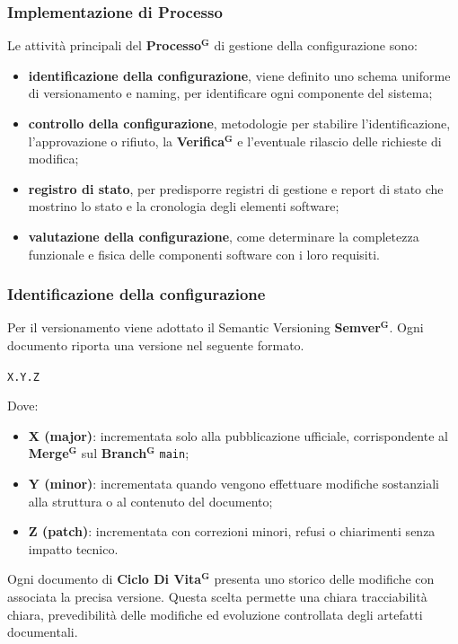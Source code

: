 \documentclass[a4paper,12pt]{article}
\newcommand{\term}[1]{\textbf{#1}$^\mathbf{G}$}
\begin{document}
\subsubsection{Implementazione di Processo}
Le attività principali del \term{Processo} di gestione della configurazione sono:
\begin{itemize}
    \item \textbf{identificazione della configurazione}, viene definito uno schema uniforme di versionamento e naming, per identificare ogni componente del sistema;
    \item \textbf{controllo della configurazione}, metodologie per stabilire l'identificazione, l'approvazione o rifiuto, la \term{Verifica} e l'eventuale rilascio delle richieste di modifica; 
    \item \textbf{registro di stato}, per predisporre registri di gestione e report di stato che mostrino lo stato e la cronologia degli elementi software;
    \item \textbf{valutazione della configurazione}, come determinare la completezza funzionale e fisica delle componenti software con i loro requisiti.
\end{itemize}

\subsubsection{Identificazione della configurazione}
Per il versionamento viene adottato il Semantic Versioning \term{Semver}.  
Ogni documento riporta una versione nel seguente formato.
\begin{center}
\texttt{X.Y.Z}
\end{center}
Dove:
\begin{itemize}
    \item \textbf{X (major)}: incrementata solo alla pubblicazione ufficiale, corrispondente al \term{Merge} sul \term{Branch} \texttt{main};
    \item \textbf{Y (minor)}: incrementata quando vengono effettuare modifiche sostanziali alla struttura o al contenuto del documento;
    \item \textbf{Z (patch)}: incrementata con correzioni minori, refusi o chiarimenti senza impatto tecnico.
\end{itemize}
Ogni documento di \term{Ciclo Di Vita} presenta uno storico delle modifiche con associata la precisa versione.
Questa scelta permette una chiara tracciabilità chiara, prevedibilità delle modifiche ed evoluzione controllata degli artefatti documentali.
\end{document}
